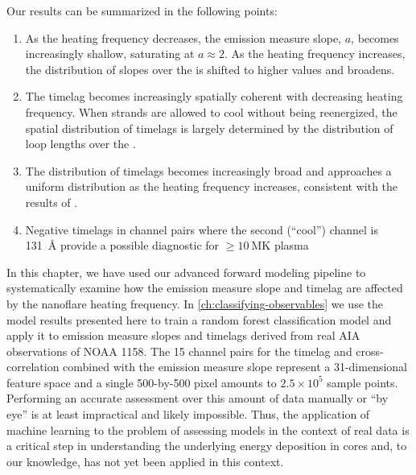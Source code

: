 Our results can be summarized in the following points:
\begin{enumerate}
    \item As the heating frequency decreases, the emission measure slope, $a$, becomes increasingly shallow, saturating at $a\approx2$. As the heating frequency increases, the distribution of slopes over the \AR{} is shifted to higher values and broadens.
    \item The timelag becomes increasingly spatially coherent with decreasing heating frequency. When strands are allowed to cool without being reenergized, the spatial distribution of timelags is largely determined by the distribution of loop lengths over the \AR{}.
    \item The distribution of timelags becomes increasingly broad and approaches a uniform distribution as the heating frequency increases, consistent with the results of \citet{viall_signatures_2016}.
    \item Negative timelags in channel pairs where the second (``cool'') channel is \SI{131}{\angstrom} provide a possible diagnostic for $\ge\SI{10}{\mega\kelvin}$ plasma
\end{enumerate}

In this chapter, we have used our advanced forward modeling pipeline to systematically examine how the emission measure slope and timelag are affected by the nanoflare heating frequency. In \autoref{ch:classifying-observables} we use the model results presented here to train a random forest classification model and apply it to emission measure slopes and timelags derived from real AIA observations of NOAA 1158. The 15 channel pairs for the timelag and cross-correlation combined with the emission measure slope represent a 31-dimensional feature space and a single 500-by-500 pixel \AR{} amounts to $2.5\times10^5$ sample points. Performing an accurate assessment over this amount of data manually or ``by eye'' is at least impractical and likely impossible. Thus, the application of machine learning to the problem of assessing models in the context of real data is a critical step in understanding the underlying energy deposition in \AR{} cores and, to our knowledge, has not yet been applied in this context. 
